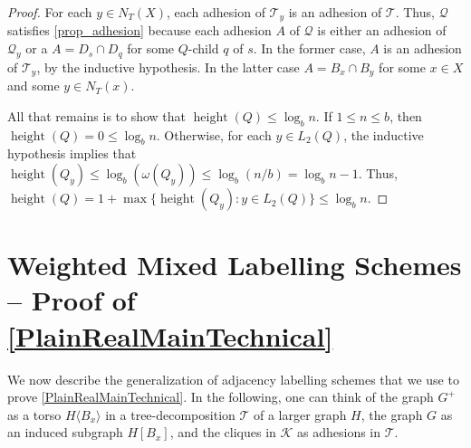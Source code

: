 \documentclass{patmorin}
\renewcommand{\le}{\leqslant}
\newcommand{\torso}[2]{{#1}\langle{#2}\rangle}
\DeclareMathOperator{\height}{height}
\begin{document}
\begin{proof}
    For each $y\in N_T(X)$, each adhesion of $\mathcal{T}_y$ is an adhesion of $\mathcal{T}$.
    Thus, $\mathcal{Q}$ satisfies \ref{prop_adhesion} because each adhesion $A$ of $\mathcal{Q}$ is either an adhesion of $\mathcal{Q}_y$ or a $A=D_s\cap D_{q}$ for some $Q$-child $q$ of $s$.  In the former case, $A$ is an adhesion of $\mathcal{T}_y$, by the inductive hypothesis. In the latter case $A=B_x\cap B_y$ for some $x\in X$ and some $y\in N_T(x)$.





    All that remains is to show that $\height(Q)\le\log_b n$.  If $1\le n \le b$, then $\height(Q)=0\le\log_b n$.  Otherwise, for each $y\in L_2(Q)$, the inductive hypothesis implies that $\height(Q_y)\le\log_b(\omega(Q_y))\le\log_b(n/b)=\log_b n - 1$.  Thus, $\height(Q)=1+\max\{\height(Q_y):y\in L_2(Q)\}\le \log_b n$.
  \end{proof}



  \section{Weighted Mixed Labelling Schemes -- Proof of \cref{PlainRealMainTechnical}}
  \label{weighted_mixed_section}

We now describe the generalization of adjacency labelling schemes that we use to prove \cref{PlainRealMainTechnical}.  In the following, one can think of the graph $G^+$ as a torso $\torso{H}{B_x}$ in a tree-decomposition $\mathcal{T}$ of a larger graph $H$, the graph $G$ as an induced subgraph $H[B_x]$, and the cliques in $\mathcal{K}$ as adhesions in $\mathcal{T}$.
\end{document}
